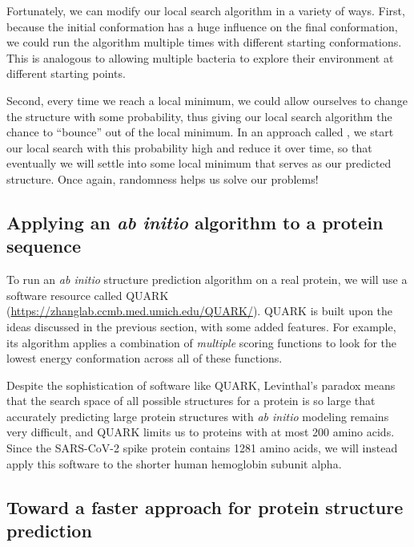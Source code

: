 \begin{qbox}\end{qbox}

Fortunately, we can modify our local search algorithm in a variety of ways. First, because the initial conformation has a huge influence on the final conformation, we could run the algorithm multiple times with different starting conformations. This is analogous to allowing multiple bacteria to explore their environment at different starting points.

Second, every time we reach a local minimum, we could allow ourselves to change the structure with some probability, thus giving our local search algorithm the chance to ``bounce'' out of the local minimum. In an approach called , we start our local search with this probability high and reduce it over time, so that eventually we will settle into some local minimum that serves as our predicted structure. Once again, randomness helps us solve our problems!

\FloatBarrier
{}
\subsection{Applying an \textit{ab initio} algorithm to a protein sequence}

To run an \textit{ab initio} structure prediction algorithm on a real protein, we will use a software resource called QUARK (\url{https://zhanglab.ccmb.med.umich.edu/QUARK/}). QUARK is built upon the ideas discussed in the previous section, with some added features. For example, its algorithm applies a combination of \textit{multiple} scoring functions to look for the lowest energy conformation across all of these functions.

Despite the sophistication of software like QUARK, Levinthal's paradox means that the search space of all possible structures for a protein is so large that accurately predicting large protein structures with \textit{ab initio} modeling remains very difficult, and QUARK limits us to proteins with at most 200 amino acids. Since the SARS-CoV-2 spike protein contains 1281 amino acids, we will instead apply this software to the shorter human hemoglobin subunit alpha. 

\FloatBarrier
{}
\subsection{Toward a faster approach for protein structure prediction}

